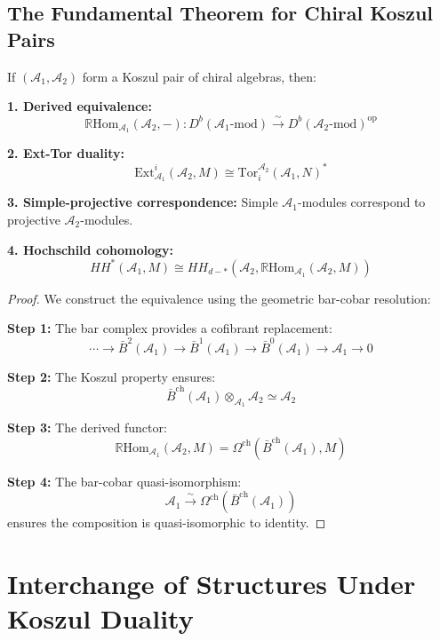 \subsection{The Fundamental Theorem for Chiral Koszul Pairs}

\begin{theorem}
If $(\mathcal{A}_1, \mathcal{A}_2)$ form a Koszul pair of chiral algebras, then:

\textbf{1. Derived equivalence:}
$$\mathbb{R}\text{Hom}_{\mathcal{A}_1}(\mathcal{A}_2, -): D^b(\mathcal{A}_1\text{-mod}) \xrightarrow{\sim} D^b(\mathcal{A}_2\text{-mod})^{\text{op}}$$

\textbf{2. Ext-Tor duality:}
$$\text{Ext}^i_{\mathcal{A}_1}(\mathcal{A}_2, M) \cong \text{Tor}_i^{\mathcal{A}_2}(\mathcal{A}_1, N)^*$$

\textbf{3. Simple-projective correspondence:}
Simple $\mathcal{A}_1$-modules correspond to projective $\mathcal{A}_2$-modules.

\textbf{4. Hochschild cohomology:}
$$HH^*(\mathcal{A}_1, M) \cong HH_{d-*}(\mathcal{A}_2, \mathbb{R}\text{Hom}_{\mathcal{A}_1}(\mathcal{A}_2, M))$$
\end{theorem}

\begin{proof}
We construct the equivalence using the geometric bar-cobar resolution:

\textbf{Step 1:} The bar complex provides a cofibrant replacement:
$$\cdots \to \bar{B}^2(\mathcal{A}_1) \to \bar{B}^1(\mathcal{A}_1) \to \bar{B}^0(\mathcal{A}_1) \to \mathcal{A}_1 \to 0$$

\textbf{Step 2:} The Koszul property ensures:
$$\bar{B}^{\text{ch}}(\mathcal{A}_1) \otimes_{\mathcal{A}_1} \mathcal{A}_2 \simeq \mathcal{A}_2$$

\textbf{Step 3:} The derived functor:
$$\mathbb{R}\text{Hom}_{\mathcal{A}_1}(\mathcal{A}_2, M) = \Omega^{\text{ch}}(\bar{B}^{\text{ch}}(\mathcal{A}_1), M)$$

\textbf{Step 4:} The bar-cobar quasi-isomorphism:
$$\mathcal{A}_1 \xrightarrow{\sim} \Omega^{\text{ch}}(\bar{B}^{\text{ch}}(\mathcal{A}_1))$$
ensures the composition is quasi-isomorphic to identity.
\end{proof}


\section{Interchange of Structures Under Koszul Duality}

